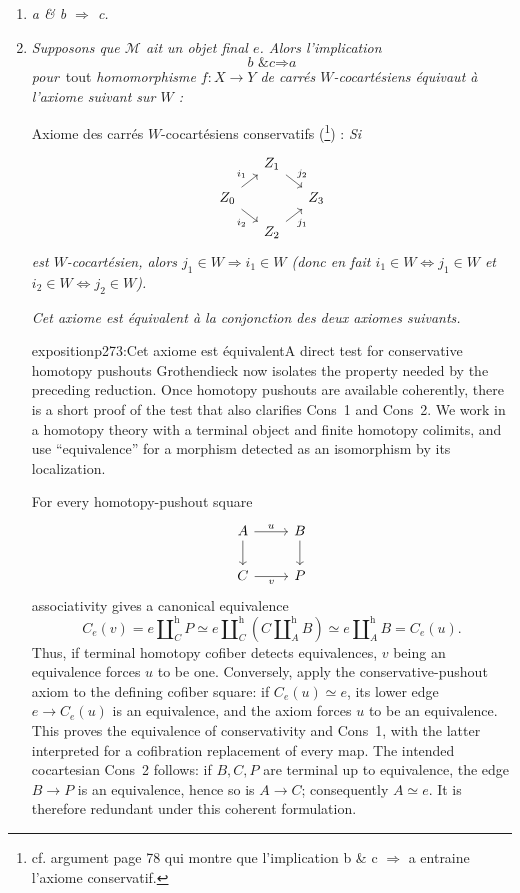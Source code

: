 \begin{enumerate}
\item[\textit{1°)}] \textit{a \& b $\Longrightarrow$ c.}


\item[\textit{2°)}] \textit{Supposons que $\mathcal{M}$ ait un objet final $e$. Alors l'implication}
\[
\textit{b \& c} \Longrightarrow \textit{a}
\]
\textit{pour}~tout \textit{homomorphisme $f : X \longrightarrow Y$ de carrés $W$-cocartésiens équivaut à l'axiome suivant sur $W$ :}

Axiome des carrés $W$-cocartésiens conservatifs (\footnote{cf. argument page 78 qui montre que l'implication b \& c $\Longrightarrow$ a entraine l'axiome conservatif.}) : \textit{Si}
\[
\begin{tikzcd}[ampersand replacement=\&, column sep=small, row sep=small]
 \& Z_1 \arrow[dr, "j_2"] \& \\
Z_0 \arrow[ur, "i_1"] \arrow[dr, "i_2"'] \& \& Z_3 \\
 \& Z_2 \arrow[ur, "j_1"'] \&
\end{tikzcd}
\]
\textit{est $W$-cocartésien, alors $j_1 \in W \Longrightarrow i_1 \in W$ (donc en fait $i_1 \in W \Longleftrightarrow j_1 \in W$ et $i_2 \in W \Longleftrightarrow j_2 \in W$).}

\textit{Cet axiome est équivalent à la conjonction des deux axiomes suivants.}

\begin{dcomment}{exposition}{p273:Cet axiome est équivalent}{A direct test for conservative homotopy pushouts}
Grothendieck now isolates the property needed by the preceding reduction. Once homotopy pushouts are available coherently, there is a short proof of the test that also clarifies Cons~1 and Cons~2. We work in a homotopy theory with a terminal object and finite homotopy colimits, and use ``equivalence'' for a morphism detected as an isomorphism by its localization.

For every homotopy-pushout square
\[
\begin{tikzcd}[ampersand replacement=\&]
 A\arrow[r,"u"]\arrow[d] \& B\arrow[d]\\
 C\arrow[r,"v"'] \& P
\end{tikzcd}
\]
associativity gives a canonical equivalence
\[
 C_e(v)=e\amalg_C^{\mathrm h}P
 \simeq e\amalg_C^{\mathrm h}(C\amalg_A^{\mathrm h}B)
 \simeq e\amalg_A^{\mathrm h}B=C_e(u).
\]
Thus, if terminal homotopy cofiber detects equivalences, $v$ being an equivalence forces $u$ to be one. Conversely, apply the conservative-pushout axiom to the defining cofiber square: if $C_e(u)\simeq e$, its lower edge $e\to C_e(u)$ is an equivalence, and the axiom forces $u$ to be an equivalence. This proves the equivalence of conservativity and Cons~1, with the latter interpreted for a cofibration replacement of every map. The intended cocartesian Cons~2 follows: if $B,C,P$ are terminal up to equivalence, the edge $B\to P$ is an equivalence, hence so is $A\to C$; consequently $A\simeq e$. It is therefore redundant under this coherent formulation.


\end{dcomment}
\end{enumerate}
